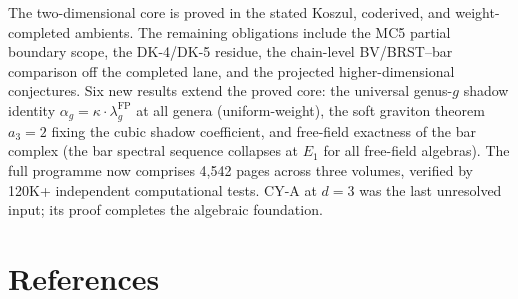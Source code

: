 \documentclass[11pt,reqno]{amsart}
\theoremstyle{definition}
\theoremstyle{remark}
\numberwithin{equation}{section}
\begin{document}
The two-dimensional core is proved in the stated Koszul,
coderived, and weight-completed ambients. The remaining obligations
include the MC5 partial boundary scope, the DK-4/DK-5 residue, the
chain-level BV/BRST--bar comparison off the completed lane, and the
projected higher-dimensional conjectures.
Six new results extend the proved core: the universal
genus-$g$ shadow identity $\alpha_g = \kappa \cdot
\lambda_g^{\mathrm{FP}}$ at all genera (uniform-weight),
the soft graviton theorem $a_3 = 2$ fixing the cubic
shadow coefficient, and free-field exactness of the bar
complex (the bar spectral sequence collapses at $E_1$
for all free-field algebras). The full programme now
comprises 4,542 pages across three volumes, verified by
120K+ independent computational tests.
CY-A at $d = 3$ was the last unresolved input; its proof
completes the algebraic foundation.


\section*{References}
\label{sec:references}
\end{document}
